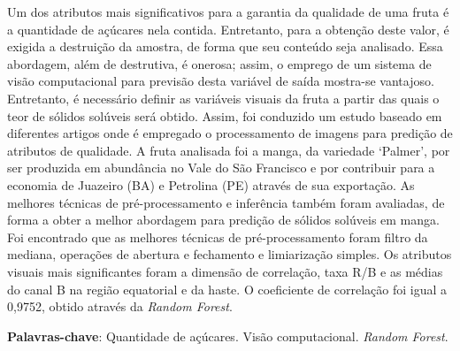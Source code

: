 \setlength{\absparsep}{18pt} %
\begin{resumo}

Um dos atributos mais significativos para a garantia da qualidade de uma fruta é a quantidade de açúcares nela contida. Entretanto, para a obtenção deste valor, é 
exigida a destruição da amostra, de forma que seu conteúdo seja analisado. Essa abordagem, além de destrutiva, é onerosa; assim, o emprego de um sistema de visão 
computacional para previsão desta variável de saída mostra-se vantajoso. Entretanto, é necessário definir as variáveis visuais da fruta a partir das quais o teor 
de sólidos solúveis será obtido. Assim, foi conduzido um estudo baseado em diferentes artigos onde é empregado o processamento de imagens para predição de atributos
 de qualidade. A fruta analisada foi a manga, da variedade ‘Palmer’, por ser produzida em abundância no Vale do São Francisco e por contribuir para a economia de 
 Juazeiro (BA) e Petrolina (PE) através de sua exportação. As melhores técnicas de pré-processamento e inferência também foram avaliadas, de forma a obter a melhor 
 abordagem para predição de sólidos solúveis em manga. Foi encontrado que as melhores técnicas de pré-processamento foram filtro da mediana, operações de abertura e fechamento e limiarização simples. Os atributos visuais mais significantes foram a dimensão de correlação, taxa R/B e as médias do canal B na região equatorial e da haste. O coeficiente de correlação foi igual a 0,9752, obtido através da \textit{Random Forest}.

 \textbf{Palavras-chave}: Quantidade de açúcares. Visão computacional. \textit{Random Forest}.

\end{resumo}

